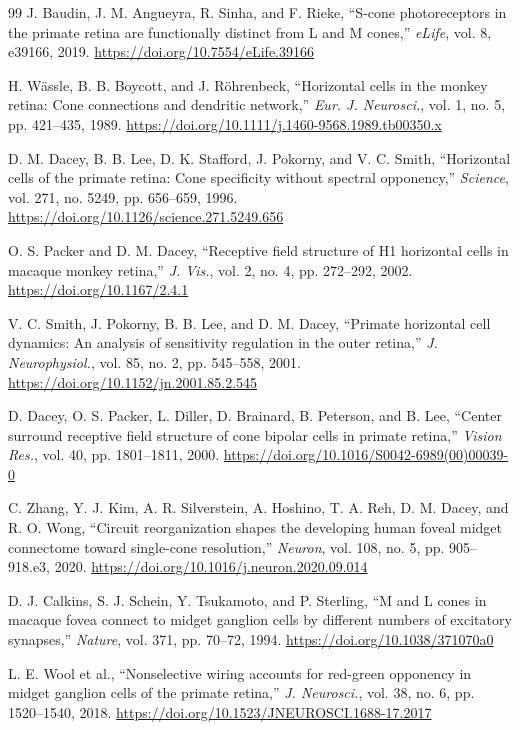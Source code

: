 \documentclass[a4paper,10pt,twocolumn,uplatex,dvipdfmx]{jsarticle}
\begin{document}
\begin{thebibliography}{99}
J. Baudin, J. M. Angueyra, R. Sinha, and F. Rieke,
``S-cone photoreceptors in the primate retina are functionally distinct
from L and M cones,''
\textit{eLife}, vol. 8, e39166, 2019.
\url{https://doi.org/10.7554/eLife.39166}

H. W\"assle, B. B. Boycott, and J. R\"ohrenbeck,
``Horizontal cells in the monkey retina: Cone connections and dendritic network,''
\textit{Eur. J. Neurosci.}, vol. 1, no. 5, pp. 421--435, 1989.
\url{https://doi.org/10.1111/j.1460-9568.1989.tb00350.x}

D. M. Dacey, B. B. Lee, D. K. Stafford, J. Pokorny, and V. C. Smith,
``Horizontal cells of the primate retina: Cone specificity without spectral opponency,''
\textit{Science}, vol. 271, no. 5249, pp. 656--659, 1996.
\url{https://doi.org/10.1126/science.271.5249.656}

O. S. Packer and D. M. Dacey,
``Receptive field structure of H1 horizontal cells in macaque monkey retina,''
\textit{J. Vis.}, vol. 2, no. 4, pp. 272--292, 2002.
\url{https://doi.org/10.1167/2.4.1}

V. C. Smith, J. Pokorny, B. B. Lee, and D. M. Dacey,
``Primate horizontal cell dynamics: An analysis of sensitivity regulation
in the outer retina,''
\textit{J. Neurophysiol.}, vol. 85, no. 2, pp. 545--558, 2001.
\url{https://doi.org/10.1152/jn.2001.85.2.545}

D. Dacey, O. S. Packer, L. Diller, D. Brainard, B. Peterson, and B. Lee,
``Center surround receptive field structure of cone bipolar cells in primate retina,''
\textit{Vision Res.}, vol. 40, pp. 1801--1811, 2000.
\url{https://doi.org/10.1016/S0042-6989(00)00039-0}

C. Zhang, Y. J. Kim, A. R. Silverstein, A. Hoshino, T. A. Reh,
D. M. Dacey, and R. O. Wong,
``Circuit reorganization shapes the developing human foveal midget
connectome toward single-cone resolution,''
\textit{Neuron}, vol. 108, no. 5, pp. 905--918.e3, 2020.
\url{https://doi.org/10.1016/j.neuron.2020.09.014}

D. J. Calkins, S. J. Schein, Y. Tsukamoto, and P. Sterling,
``M and L cones in macaque fovea connect to midget ganglion cells by
different numbers of excitatory synapses,''
\textit{Nature}, vol. 371, pp. 70--72, 1994.
\url{https://doi.org/10.1038/371070a0}

L. E. Wool et al.,
``Nonselective wiring accounts for red-green opponency in midget ganglion
cells of the primate retina,''
\textit{J. Neurosci.}, vol. 38, no. 6, pp. 1520--1540, 2018.
\url{https://doi.org/10.1523/JNEUROSCI.1688-17.2017}


\end{thebibliography}
\end{document}
